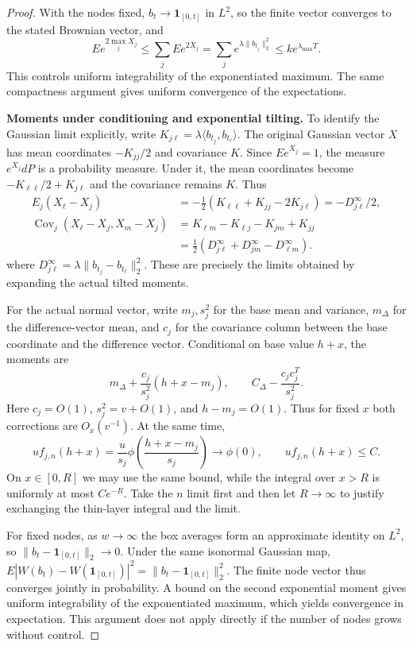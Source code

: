 \documentclass[a4paper,11pt]{article}
\theoremstyle{remark}
\begin{document}
\begin{proof}
With the nodes fixed, $b_t\to\mathbf1_{[0,t]}$ in $L^2$, so the finite vector converges to
the stated Brownian vector, and
\[
 E e^{2\max_jX_j}\le\sum_jE e^{2X_j}
 =\sum_je^{\lambda\|b_{t_j}\|_2^2}\le k e^{\lambda_{\max}T}.
\]
This controls uniform integrability of the exponentiated maximum. The same compactness argument gives uniform convergence of the expectations.

\medskip\noindent\textbf{Moments under conditioning and exponential tilting.}
To identify the Gaussian limit explicitly, write
$K_{j\ell}=\lambda\langle b_{t_j},b_{t_\ell}\rangle$.
The original Gaussian vector $X$ has mean coordinates $-K_{jj}/2$ and covariance $K$.
Since $Ee^{X_j}=1$, the measure $e^{X_j}dP$ is a probability measure. Under it, the mean coordinates become
$-K_{\ell\ell}/2+K_{j\ell}$ and the covariance remains $K$. Thus
\begin{align*}
 E_j(X_\ell-X_j)
 &=-\tfrac12(K_{\ell\ell}+K_{jj}-2K_{j\ell})=-D_{j\ell}^{\infty}/2,\\
 \operatorname{Cov}_j(X_\ell-X_j,X_m-X_j)
 &=K_{\ell m}-K_{\ell j}-K_{jm}+K_{jj}\\
 &=\tfrac12(D_{j\ell}^{\infty}+D_{jm}^{\infty}-D_{\ell m}^{\infty}).
\end{align*}
where $D_{j\ell}^{\infty}=\lambda\|b_{t_j}-b_{t_\ell}\|_2^2$.
These are precisely the limits obtained by expanding the actual tilted moments.

For the actual normal vector, write $m_j,s_j^2$ for the base mean and variance, $m_\Delta$ for the difference-vector mean,
and $c_j$ for the covariance column between the base coordinate and the difference vector. Conditional on base value $h+x$, the moments are
\[
 m_\Delta+\frac{c_j}{s_j^2}(h+x-m_j),\qquad
 C_\Delta-\frac{c_jc_j^T}{s_j^2}.
\]
Here $c_j=O(1)$, $s_j^2=v+O(1)$, and $h-m_j=O(1)$.
Thus for fixed $x$ both corrections are $O_x(v^{-1})$.
At the same time,
\[
 uf_{j,n}(h+x)=\frac{u}{s_j}\phi\!\left(\frac{h+x-m_j}{s_j}\right)
 \longrightarrow\phi(0),\qquad
 uf_{j,n}(h+x)\le C.
\]
On $x\in[0,R]$ we may use the same bound, while the integral over $x>R$ is uniformly at most $Ce^{-R}$.
Take the $n$ limit first and then let $R\to\infty$ to justify exchanging the thin-layer integral and the limit.

For fixed nodes, as $w\to\infty$ the box averages form an approximate identity on $L^2$,
so $\|b_t-\mathbf1_{[0,t]}\|_2\to0$.
Under the same isonormal Gaussian map,
$E|W(b_t)-W(\mathbf1_{[0,t]})|^2=\|b_t-\mathbf1_{[0,t]}\|_2^2$.
The finite node vector thus converges jointly in probability. A bound on the second exponential moment gives uniform integrability of the exponentiated maximum,
which yields convergence in expectation. This argument does not apply directly if the number of nodes grows without control.

\end{proof}
\end{document}
